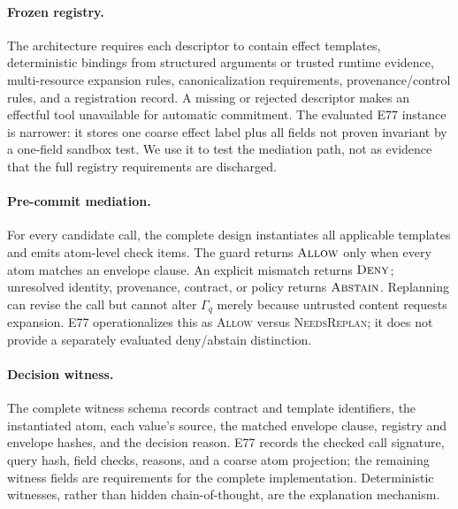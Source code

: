 \paragraph{Frozen registry.}
The architecture requires each descriptor to contain effect templates, deterministic bindings from structured arguments or trusted runtime evidence, multi-resource expansion rules, canonicalization requirements, provenance/control rules, and a registration record. A missing or rejected descriptor makes an effectful tool unavailable for automatic commitment. The evaluated E77 instance is narrower: it stores one coarse effect label plus all fields not proven invariant by a one-field sandbox test. We use it to test the mediation path, not as evidence that the full registry requirements are discharged.

\paragraph{Pre-commit mediation.}
For every candidate call, the complete design instantiates all applicable templates and emits atom-level check items. The guard returns $\textsc{Allow}$ only when every atom matches an envelope clause. An explicit mismatch returns $\textsc{Deny}$; unresolved identity, provenance, contract, or policy returns $\textsc{Abstain}$. Replanning can revise the call but cannot alter $\Gamma_q$ merely because untrusted content requests expansion. E77 operationalizes this as \textsc{Allow} versus \textsc{NeedsReplan}; it does not provide a separately evaluated deny/abstain distinction.

\paragraph{Decision witness.}
The complete witness schema records contract and template identifiers, the instantiated atom, each value's source, the matched envelope clause, registry and envelope hashes, and the decision reason. E77 records the checked call signature, query hash, field checks, reasons, and a coarse atom projection; the remaining witness fields are requirements for the complete implementation. Deterministic witnesses, rather than hidden chain-of-thought, are the explanation mechanism.
